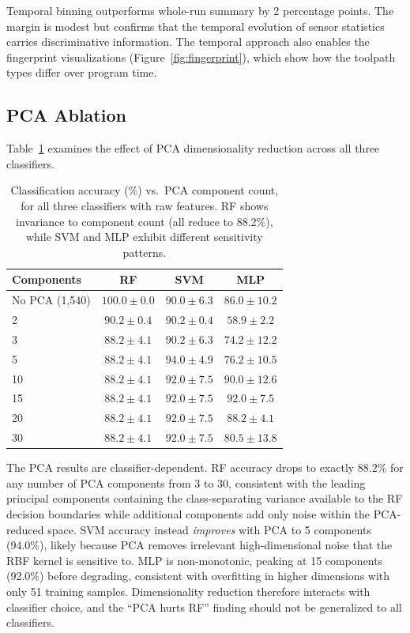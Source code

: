 Temporal binning outperforms whole-run summary by 2 percentage points. The margin is modest but confirms that the temporal evolution of sensor statistics carries discriminative information. The temporal approach also enables the fingerprint visualizations (Figure~\ref{fig:fingerprint}), which show how the toolpath types differ over program time.

\subsection{PCA Ablation}

Table~\ref{tab:pca_ablation} examines the effect of PCA dimensionality reduction across all three classifiers.

\begin{table}[H]
\caption{Classification accuracy (\%) vs.\ PCA component count, for all three classifiers with raw features. RF shows invariance to component count (all reduce to 88.2\%), while SVM and MLP exhibit different sensitivity patterns.}\label{tab:pca_ablation}
\centering
\begin{tabular}{lccc}
\toprule
\textbf{Components} & \textbf{RF} & \textbf{SVM} & \textbf{MLP} \\
\midrule
No PCA (1{,}540)  & $100.0 \pm 0.0$ & $90.0 \pm 6.3$ & $86.0 \pm 10.2$ \\
2                  & $90.2 \pm 0.4$ & $90.2 \pm 0.4$ & $58.9 \pm 2.2$ \\
3                  & $88.2 \pm 4.1$ & $90.2 \pm 6.3$ & $74.2 \pm 12.2$ \\
5                  & $88.2 \pm 4.1$ & $94.0 \pm 4.9$ & $76.2 \pm 10.5$ \\
10                 & $88.2 \pm 4.1$ & $92.0 \pm 7.5$ & $90.0 \pm 12.6$ \\
15                 & $88.2 \pm 4.1$ & $92.0 \pm 7.5$ & $92.0 \pm 7.5$ \\
20                 & $88.2 \pm 4.1$ & $92.0 \pm 7.5$ & $88.2 \pm 4.1$ \\
30                 & $88.2 \pm 4.1$ & $92.0 \pm 7.5$ & $80.5 \pm 13.8$ \\
\bottomrule
\end{tabular}
\end{table}

The PCA results are classifier-dependent. RF accuracy drops to exactly 88.2\% for any number of PCA components from 3 to 30, consistent with the leading principal components containing the class-separating variance available to the RF decision boundaries while additional components add only noise within the PCA-reduced space. SVM accuracy instead \textit{improves} with PCA to 5 components (94.0\%), likely because PCA removes irrelevant high-dimensional noise that the RBF kernel is sensitive to. MLP is non-monotonic, peaking at 15 components (92.0\%) before degrading, consistent with overfitting in higher dimensions with only 51 training samples. Dimensionality reduction therefore interacts with classifier choice, and the ``PCA hurts RF'' finding should not be generalized to all classifiers.


